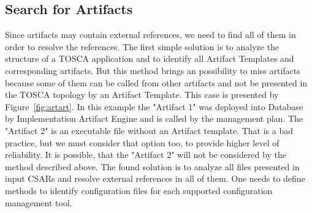 \subsection{Search for Artifacts}\label{subs:searchart}
Since artifacts may contain external references, we need to find all of them in order to resolve the references.
The first simple solution is to analyze the structure of a TOSCA application and to identify all Artifact Templates and corresponding artifacts.
But this method brings an possibility to miss artifacts because some of them can be called from other artifacts and not be presented in the TOSCA topology by an Artifact Template.
This case is presented by Figure~\ref{fig:artart}.
In this example the "Artifact 1" was deployed into Database by Implementation Artifact Engine and is called by the management plan.
The "Artifact 2" is an executable file without an Artifact template.
That is a bad practice, but we must consider that option too, to provide higher level of reliability.
It is possible, that the "Artifact 2" will not be considered by the method described above.
The found solution is to analyze all files presented in input CSARs and resolve external references in all of them.
One needs to define methods to identify configuration files for each supported configuration management tool.


